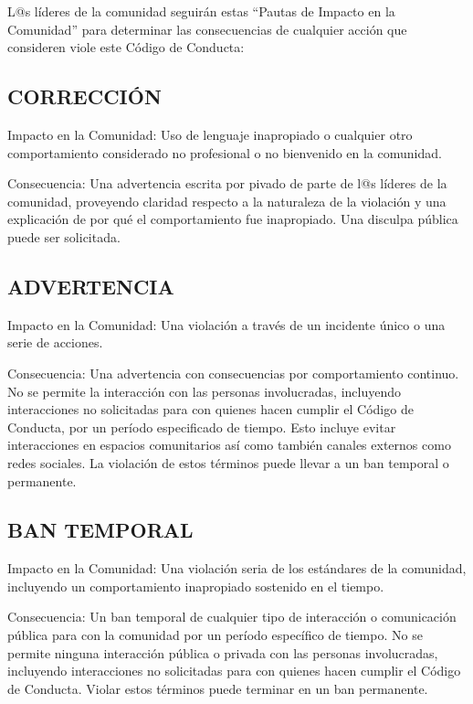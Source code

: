 \documentclass[
]{book}
\begin{document}
L@s líderes de la comunidad seguirán estas ``Pautas de Impacto en la Comunidad'' para determinar las consecuencias de cualquier acción que consideren viole este Código de Conducta:

\hypertarget{correcciuxf3n}{%
\subsection{CORRECCIÓN}\label{correcciuxf3n}}

Impacto en la Comunidad: Uso de lenguaje inapropiado o cualquier otro comportamiento considerado no profesional o no bienvenido en la comunidad.

Consecuencia: Una advertencia escrita por pivado de parte de l@s líderes de la comunidad, proveyendo claridad respecto a la naturaleza de la violación y una explicación de por qué el comportamiento fue inapropiado. Una disculpa pública puede ser solicitada.

\hypertarget{advertencia}{%
\subsection{ADVERTENCIA}\label{advertencia}}

Impacto en la Comunidad: Una violación a través de un incidente único o una serie de acciones.

Consecuencia: Una advertencia con consecuencias por comportamiento continuo. No se permite la interacción con las personas involucradas, incluyendo interacciones no solicitadas para con quienes hacen cumplir el Código de Conducta, por un período especificado de tiempo. Esto incluye evitar interacciones en espacios comunitarios así como también canales externos como redes sociales. La violación de estos términos puede llevar a un ban temporal o permanente.

\hypertarget{ban-temporal}{%
\subsection{BAN TEMPORAL}\label{ban-temporal}}

Impacto en la Comunidad: Una violación seria de los estándares de la comunidad, incluyendo un comportamiento inapropiado sostenido en el tiempo.

Consecuencia: Un ban temporal de cualquier tipo de interacción o comunicación pública para con la comunidad por un período específico de tiempo. No se permite ninguna interacción pública o privada con las personas involucradas, incluyendo interacciones no solicitadas para con quienes hacen cumplir el Código de Conducta. Violar estos términos puede terminar en un ban permanente.
\end{document}
